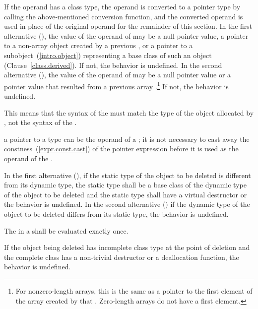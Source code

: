 \pnum
{}%
If the operand has a class type, the operand is converted to a pointer
type by calling the above-mentioned conversion function, and the
converted operand is used in place of the original operand for the
remainder of this section.
%
In the first alternative
(), the value of the operand of  may
be a null pointer value, a pointer to a non-array object
created by a previous ,
or a pointer to a
subobject~(\ref{intro.object}) representing a base class of such an
object (Clause~\ref{class.derived}). If not, the behavior is undefined.
%
%
In the second alternative (), the value of the
operand of 
may be a null pointer value or a pointer value
that resulted from
a previous array .\footnote{For nonzero-length
arrays, this is the same as a pointer to the first
element of the array created by that .
Zero-length arrays do not have a first element.}
If not, the behavior is undefined.
\begin{note}
This means that the syntax of the  must
match the type of the object allocated by , not the syntax of the
.
\end{note}
\begin{note}
a pointer to a  type can be the operand of a
; it is not necessary to cast away the
constness~(\ref{expr.const.cast}) of the pointer expression before it is
used as the operand of the .
\end{note}

\pnum
{}%
In the first alternative (), if the static type of
the object to be deleted is different from its dynamic type, the static type shall be
a base class of the dynamic type of the object to be deleted and the static type shall
have a virtual destructor or the behavior is undefined. In the second
alternative () if the dynamic type of the object to
be deleted differs from its static type, the behavior is undefined.

\pnum
The  in a  shall
be evaluated exactly once.

\pnum
{}%
If the object being deleted has incomplete class type at the point of
deletion and the complete class has a non-trivial destructor or a
deallocation function, the behavior is undefined.

